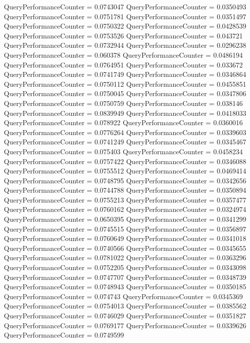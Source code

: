 \documentclass[9pt]{article}
\theoremstyle{plain}
\theoremstyle{definition}
\theoremstyle{remark}
\numberwithin{equation}{section}
\begin{document}
QueryPerformanceCounter  =  0.0743047
QueryPerformanceCounter  =  0.0350493
QueryPerformanceCounter  =  0.0751781
QueryPerformanceCounter  =  0.0351497
QueryPerformanceCounter  =  0.0750322
QueryPerformanceCounter  =  0.0428539
QueryPerformanceCounter  =  0.0753526
QueryPerformanceCounter  =  0.043721
QueryPerformanceCounter  =  0.0732944
QueryPerformanceCounter  =  0.0296238
QueryPerformanceCounter  =  0.060378
QueryPerformanceCounter  =  0.0486194
QueryPerformanceCounter  =  0.0764951
QueryPerformanceCounter  =  0.033672
QueryPerformanceCounter  =  0.0741749
QueryPerformanceCounter  =  0.0346864
QueryPerformanceCounter  =  0.0750112
QueryPerformanceCounter  =  0.0455851
QueryPerformanceCounter  =  0.0750045
QueryPerformanceCounter  =  0.0347806
QueryPerformanceCounter  =  0.0750759
QueryPerformanceCounter  =  0.038146
QueryPerformanceCounter  =  0.0839949
QueryPerformanceCounter  =  0.0418033
QueryPerformanceCounter  =  0.078922
QueryPerformanceCounter  =  0.0360016
QueryPerformanceCounter  =  0.0776264
QueryPerformanceCounter  =  0.0339603
QueryPerformanceCounter  =  0.0741249
QueryPerformanceCounter  =  0.0345467
QueryPerformanceCounter  =  0.075403
QueryPerformanceCounter  =  0.0458234
QueryPerformanceCounter  =  0.0757422
QueryPerformanceCounter  =  0.0346088
QueryPerformanceCounter  =  0.0755512
QueryPerformanceCounter  =  0.0469414
QueryPerformanceCounter  =  0.0748795
QueryPerformanceCounter  =  0.0342656
QueryPerformanceCounter  =  0.0744788
QueryPerformanceCounter  =  0.0350894
QueryPerformanceCounter  =  0.0755213
QueryPerformanceCounter  =  0.0357477
QueryPerformanceCounter  =  0.0760162
QueryPerformanceCounter  =  0.0324974
QueryPerformanceCounter  =  0.0650395
QueryPerformanceCounter  =  0.0341299
QueryPerformanceCounter  =  0.0745515
QueryPerformanceCounter  =  0.0356897
QueryPerformanceCounter  =  0.0760649
QueryPerformanceCounter  =  0.0341018
QueryPerformanceCounter  =  0.0740566
QueryPerformanceCounter  =  0.0345655
QueryPerformanceCounter  =  0.0781022
QueryPerformanceCounter  =  0.0363296
QueryPerformanceCounter  =  0.0752205
QueryPerformanceCounter  =  0.0343098
QueryPerformanceCounter  =  0.0747707
QueryPerformanceCounter  =  0.0348739
QueryPerformanceCounter  =  0.0748943
QueryPerformanceCounter  =  0.0350185
QueryPerformanceCounter  =  0.074743
QueryPerformanceCounter  =  0.0345369
QueryPerformanceCounter  =  0.0754013
QueryPerformanceCounter  =  0.0385562
QueryPerformanceCounter  =  0.0746029
QueryPerformanceCounter  =  0.0351827
QueryPerformanceCounter  =  0.0769177
QueryPerformanceCounter  =  0.0339626
QueryPerformanceCounter  =  0.0749599
\end{document}
